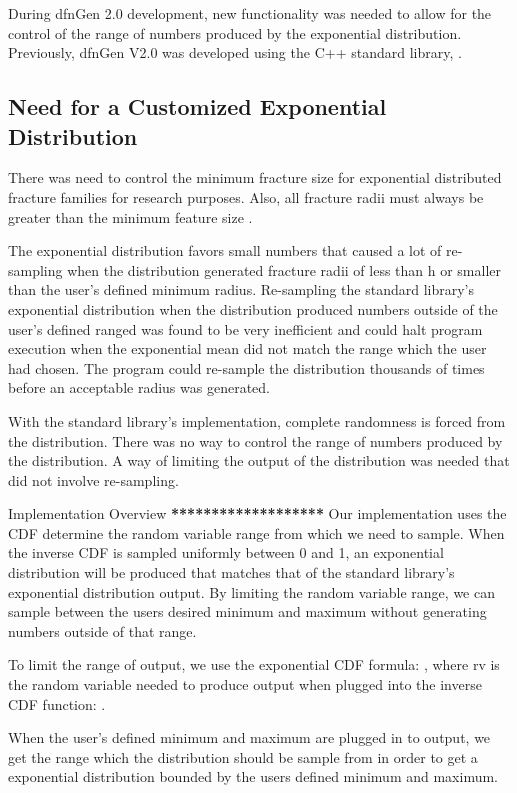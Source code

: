 \documentclass[letterpaper,10pt,english]{sphinxmanual}
\begin{document}
During dfnGen 2.0 development, new functionality was needed to allow for the
control of the range of numbers produced by the exponential distribution.
Previously, dfnGen V2.0 was developed using the C++ standard library,
.


\subsection{Need for a Customized Exponential Distribution}
\label{dfngen:need-for-a-customized-exponential-distribution}
There was need to control the
minimum fracture size for exponential distributed fracture families for research
purposes. Also, all fracture radii must always be greater than the minimum
feature size .

The exponential distribution favors small numbers that caused a lot of
re-sampling when the distribution generated fracture radii of less than h or
smaller than the user’s defined minimum radius. Re-sampling the standard
library’s exponential distribution when the distribution produced numbers
outside of the user’s defined ranged was found to be very inefficient and could
halt program execution when the exponential mean did not match the range which
the user had chosen. The program could re-sample the distribution thousands of
times before an acceptable radius was generated.

With the standard library’s implementation, complete randomness is forced from
the distribution. There was no way to control the range of numbers produced by
the distribution. A way of limiting the output of the distribution was needed
that did not involve re-sampling.

Implementation Overview \textbf{*******************} Our implementation uses the CDF
determine the random variable range from which we need to sample. When the
inverse CDF is sampled uniformly between 0 and 1, an exponential distribution
will be produced that matches that of the standard library’s exponential
distribution output. By limiting the random variable range, we can sample
between the users desired minimum and maximum without generating numbers outside
of that range.

To limit the range of output, we use the exponential CDF formula: , where rv is the random variable needed to produce output
when plugged into the inverse CDF function: .

When the user’s defined minimum and maximum are plugged in to output, we get the
range which the distribution should be sample from in order to get a exponential
distribution bounded by the users defined minimum and maximum.
\end{document}
